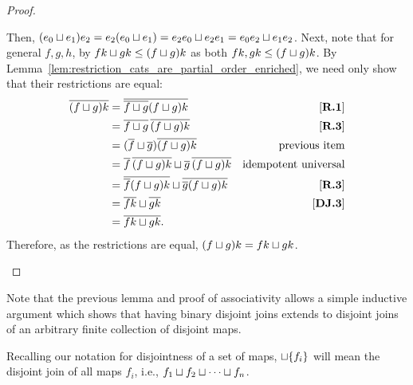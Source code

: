\begin{proof}
\begin{enumerate}[{(}i{)}]
      Then, $(e_0 \sqcup e_1)e_2 = e_2(e_0 \sqcup e_1) = e_2 e_0 \sqcup e_2 e_1 =
      e_0 e_2 \sqcup e_1 e_2$.
      Next, note that for general $f,g,h$, by  $f k \sqcup g k \le (f\sqcup g) k$ as both
      $f k, g k \le (f\sqcup g) k$.
      By Lemma~\ref{lem:restriction_cats_are_partial_order_enriched}, we need only show that their
      restrictions are equal:
      \begin{align*}
        \overline{(f\sqcup g)k} &= \overline{\overline{f\sqcup g}(f\sqcup g) k } & [\text{\bfseries {R}.{1}}] \\
        & = \overline{f\sqcup g}\, \overline{(f\sqcup g)k } & [\text{\bfseries {R}.{3}}]\\
        & = (\overline{f}\sqcup \overline{g}) \overline{(f\sqcup g)k }  & \text{previous item}\\
        & = \overline{f}\,\overline{(f\sqcup g)k } \sqcup \overline{g}\, \overline{(f\sqcup g)k }
          &\text{idempotent universal}\\
        & = \overline{\overline{f} (f\sqcup g)k} \sqcup \overline{\overline{g} (f\sqcup g)k} & [\text{\bfseries {R}.{3}}]\\
        & = \overline{f k} \sqcup \overline{g k}&\text{\ensuremath{[\text{\bfseries {DJ}.{3}}]}}\\
        & = \overline{f k \sqcup g k}.
      \end{align*}
      Therefore, as the restrictions are equal, $(f\sqcup g)k = f k \sqcup g k$.
  \end{enumerate}
\end{proof}

Note that the previous lemma and proof of associativity allows a simple inductive argument which
shows that having binary disjoint joins extends to disjoint joins of an arbitrary
finite collection of disjoint maps.

Recalling our notation for disjointness of a set of maps,
$\sqcup \{f_i\}$ will mean the disjoint join of all maps $f_i$, i.e.,
$f_1 \sqcup f_2 \sqcup \cdots \sqcup f_n$.

